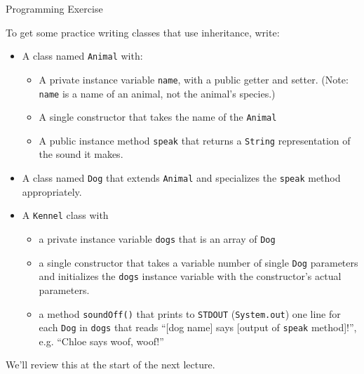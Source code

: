 \documentclass{beamer}
\begin{document}
\begin{frame}[fragile]{Programming Exercise}


To get some practice writing classes that use inheritance, write:
\begin{itemize}
\item A class named {\tt Animal} with:
\begin{itemize}
\item A private instance variable {\tt name}, with a public getter and setter. (Note: {\tt name} is a name of an animal, not the animal's species.)
\item A single constructor that takes the name of the {\tt Animal}
\item A public instance method {\tt speak} that returns a {\tt String} representation of the sound it makes.
\end{itemize}

\item A class named {\tt Dog} that extends {\tt Animal} and specializes the {\tt speak} method appropriately.

\item A {\tt Kennel} class with 
\begin{itemize}
\item a private instance variable {\tt dogs} that is an array of {\tt Dog}
\item a single constructor that takes a variable number of single {\tt Dog} parameters and initializes the {\tt dogs} instance variable with the constructor's actual parameters.
\item a method {\tt soundOff()} that prints to {\tt STDOUT} ({\tt System.out}) one line for each {\tt Dog} in {\tt dogs} that reads ``[dog name] says [output of {\tt speak} method]!'', e.g. ``Chloe says woof, woof!''
\end{itemize}

\end{itemize}
We'll review this at the start of the next lecture.

\end{frame}




\end{document}
